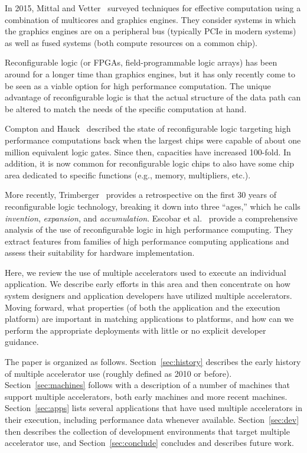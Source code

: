 In 2015, Mittal and Vetter~\cite{mv15} surveyed techniques for effective
computation using a combination of multicores and graphics engines. They
consider systems in which the graphics engines are on a peripheral bus
(typically PCIe in modern systems) as well as fused systems (both compute
resources on a common chip).

Reconfigurable logic (or FPGAs, field-programmable logic arrays) has been
around for a longer time than graphics engines, but it has only recently come
to be seen as a viable option for high performance computation.
The unique advantage of reconfigurable logic is that the actual 
structure of the data path can be altered to match the needs of the specific
computation at hand.

Compton and Hauck~\cite{ch02} described the state of reconfigurable logic
targeting high performance computations back when the largest chips were
capable of about one million equivalent logic gates.  Since then, capacities
have increased 100-fold.  In addition, it is now common for reconfigurable
logic chips to also have some chip area dedicated to specific functions (e.g.,
memory, multipliers, etc.).

More recently, Trimberger~\cite{Trimberger15} provides a retrospective on
the first 30 years of reconfigurable logic technology, breaking it down into
three ``ages,'' which he calls \emph{invention}, \emph{expansion}, and
\emph{accumulation}.  Escobar et al.~\cite{ecv16} provide a comprehensive
analysis of the use of reconfigurable logic in high performance computing.
They extract features from families of high performance computing
applications and assess their suitability for hardware implementation.

Here, we review the use of multiple accelerators used to execute an individual
application. We describe early efforts in this area and then concentrate on
how system designers and application developers have utilized multiple
accelerators.  Moving forward, what properties (of both the application and
the execution platform) are important in matching applications to platforms,
and how can we perform the appropriate deployments with little or no
explicit developer guidance.

The paper is organized as follows.  Section~\ref{sec:history} describes
the early history of multiple accelerator use (roughly defined as 2010
or before).  Section~\ref{sec:machines}
follows with a description of a number of machines that support multiple
accelerators, both early machines and more recent machines.
Section~\ref{sec:apps} lists several applications that have used
multiple accelerators in their execution, including performance data
whenever available.
Section~\ref{sec:dev} then describes the collection of development
environments that target multiple accelerator use, and
Section~\ref{sec:conclude} concludes and describes future work.
